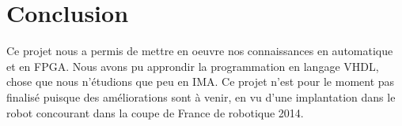 %

\section{Conclusion}
Ce projet nous a permis de mettre en oeuvre nos connaissances en automatique et en FPGA. Nous avons pu approndir la programmation en langage VHDL, chose que
nous n'étudions que peu en IMA.  
Ce projet n'est pour le moment pas finalisé puisque des améliorations sont à venir, en vu d'une implantation dans le robot concourant dans la coupe de France de robotique
2014. 